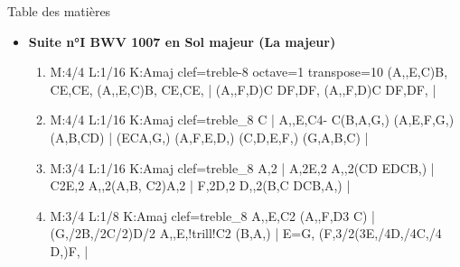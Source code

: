 \documentclass[a4paper,twoside]{article}
\begin{document}
\begin{center}
{\LARGE Table des matières}

\vspace{1cm}
\large
\newlength{\titlelen}
\settowidth{\titlelen}{Allemande}
\addtolength{\titlelen}{0.5em}
\newlength{\titleseplen}
\setlength{\titleseplen}{0.1cm}
\newlength{\suitesep}
\setlength{\suitesep}{1cm}
%
%
\begin{itemize}
  \item \textbf{Suite n°I BWV 1007 en Sol majeur (La majeur)} \dotfill\ \pageref{SuiteI}
  \begin{enumerate}
	\item {}
\begin{abcsvg}
  M:4/4
  L:1/16
  K:Amaj clef=treble-8 octave=1 transpose=10
  (A,,E,C)B, CE,CE, (A,,E,C)B, CE,CE, |
  (A,,F,D)C DF,DF, (A,,F,D)C DF,DF, |
\end{abcsvg}
  \makebox[2cm][l]{ \dotfill\ \pageref{Iprelude}}
  \par\vspace{\titleseplen}

	\item {}
\begin{abcsvg}
  M:4/4
  L:1/16
  K:Amaj clef=treble_8
  C |
  {A,,E,}C4- C(B,A,G,) (A,E,F,G,) (A,B,CD) |
  (ECA,G,) (A,F,E,D,) (C,D,E,F,) (G,A,B,C) |
\end{abcsvg}
  \makebox[2cm][l]{ \dotfill\ \pageref{Iallemande}}
  \par\vspace{\titleseplen}

	\item {}
\begin{abcsvg}
  M:3/4
  L:1/16
  K:Amaj clef=treble_8
  A,2 |
  A,2E,2 A,,2(CD EDCB,) |
  C2E,2 A,,2(A,B, C2)A,2 |
  F,2D,2 D,,2(B,C DCB,A,) |
\end{abcsvg}
  \makebox[2cm][l]{ \dotfill\ \pageref{Icourante}}
  \par\vspace{\titleseplen}

	\item {}
\begin{abcsvg}
  M:3/4
  L:1/8
  K:Amaj clef=treble_8
  {A,,E,}C2 ({A,,F,}D3 C) |
  (G,/2B,/2C/2)D/2 {A,,E,}!trill!C2 (B,A,) |
  E=G, (F,3/2(3E,/4D,/4C,/4 D,)F, |
\end{abcsvg}
  \makebox[2cm][l]{ \dotfill\ \pageref{Isarabande}}
  \par\vspace{\titleseplen}


\end{enumerate}
\end{itemize}
\end{center}
\end{document}
